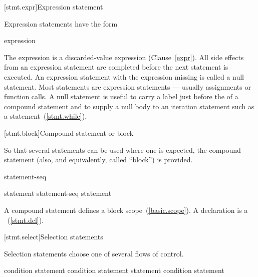[stmt.expr]{Expression statement}%

\pnum
Expression statements have the form

\begin{bnf}
\br
    expression\opt \terminal{;}
\end{bnf}

The expression is
a discarded-value expression (Clause~\ref{expr}).
All
%
side effects from an expression statement
are completed before the next statement is executed.
%
%
An expression statement with the expression missing is called a null
statement.
\enternote
Most statements are expression statements --- usually assignments or
function calls. A null statement is useful to carry a label just before
the \tcode{\}} of a compound statement and to supply a null body to an
iteration statement such as a 
statement~(\ref{stmt.while}).
\exitnote

[stmt.block]{Compound statement or block}%
%
%

\pnum
So that several statements can be used where one is expected, the
compound statement (also, and equivalently, called ``block'') is
provided.

\begin{bnf}
\br
    \terminal{\{} statement-seq\opt \terminal{\}}
\end{bnf}

\begin{bnf}
\br
    statement\br
    statement-seq statement
\end{bnf}

A compound statement defines a block scope~(\ref{basic.scope}).
\enternote
A declaration is a ~(\ref{stmt.dcl}).
\exitnote

[stmt.select]{Selection statements}%

\pnum
Selection statements choose one of several flows of control.

%
%
%
\begin{bnf}
\br
     condition \terminal{)} statement\br
     condition \terminal{)} statement  statement\br
     condition \terminal{)} statement
\end{bnf}

